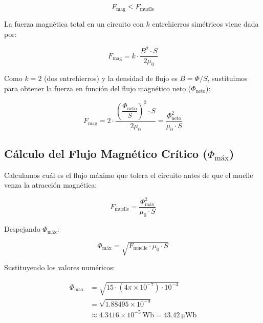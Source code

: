 \documentclass[12pt,a4paper]{article}
\begin{document}
\begin{equation}
    F_{\text{mag}} \le F_{\text{muelle}}
\end{equation}

La fuerza magnética total en un circuito con $k$ entrehierros simétricos viene dada por:

\begin{equation}
    F_{\text{mag}} = k \cdot \frac{B^2 \cdot S}{2\mu_0}
\end{equation}

Como $k = 2$ (dos entrehierros) y la densidad de flujo es $B = \Phi/S$, sustituimos para obtener la fuerza en función del flujo magnético neto ($\Phi_{\text{neto}}$):

\begin{equation}
    F_{\text{mag}} = 2 \cdot \frac{\left(\dfrac{\Phi_{\text{neto}}}{S}\right)^2 \cdot S}{2\mu_0}
    = \frac{\Phi_{\text{neto}}^2}{\mu_0 \cdot S}
\end{equation}

\subsection{Cálculo del Flujo Magnético Crítico ($\Phi_{\text{máx}}$)}

Calculamos cuál es el flujo máximo que tolera el circuito antes de que el muelle venza la atracción magnética:

\begin{equation}
    F_{\text{muelle}} = \frac{\Phi_{\text{máx}}^2}{\mu_0 \cdot S}
\end{equation}

Despejando $\Phi_{\text{máx}}$:

\begin{equation}
    \Phi_{\text{máx}} = \sqrt{F_{\text{muelle}} \cdot \mu_0 \cdot S}
\end{equation}

Sustituyendo los valores numéricos:

\begin{align}
    \Phi_{\text{máx}} &= \sqrt{15 \cdot (4\pi \times 10^{-7}) \cdot 10^{-4}} \nonumber \\
                      &= \sqrt{1.88495 \times 10^{-9}} \nonumber \\
                      &\approx 4.3416 \times 10^{-5}\ \si{\weber}
                        = \SI{43.42}{\micro\weber}
\end{align}

\begin{center}
\end{center}
\end{document}
